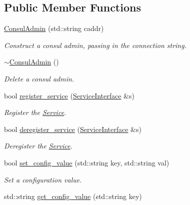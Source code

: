 \subsection*{Public Member Functions}
\begin{DoxyCompactItemize}
\item 
\hypertarget{classConsulAdmin_aafb2c493da3672acc348fd865036a883}{\hyperlink{classConsulAdmin_aafb2c493da3672acc348fd865036a883}{Consul\-Admin} (std\-::string caddr)}\label{classConsulAdmin_aafb2c493da3672acc348fd865036a883}

\begin{DoxyCompactList}\small\item\em Construct a consul admin, passing in the connection string. \end{DoxyCompactList}\item 
\hypertarget{classConsulAdmin_ac84ff8c80f6bd731329c8acb6d236759}{\hyperlink{classConsulAdmin_ac84ff8c80f6bd731329c8acb6d236759}{$\sim$\-Consul\-Admin} ()}\label{classConsulAdmin_ac84ff8c80f6bd731329c8acb6d236759}

\begin{DoxyCompactList}\small\item\em Delete a consul admin. \end{DoxyCompactList}\item 
\hypertarget{classConsulAdmin_ac57f2f235c1b9a2f48a8d2e9f0b7867d}{bool \hyperlink{classConsulAdmin_ac57f2f235c1b9a2f48a8d2e9f0b7867d}{register\-\_\-service} (\hyperlink{classServiceInterface}{Service\-Interface} \&s)}\label{classConsulAdmin_ac57f2f235c1b9a2f48a8d2e9f0b7867d}

\begin{DoxyCompactList}\small\item\em Register the \hyperlink{classService}{Service}. \end{DoxyCompactList}\item 
\hypertarget{classConsulAdmin_abd76347ba5a0798b3960672c8861d3e9}{bool \hyperlink{classConsulAdmin_abd76347ba5a0798b3960672c8861d3e9}{deregister\-\_\-service} (\hyperlink{classServiceInterface}{Service\-Interface} \&s)}\label{classConsulAdmin_abd76347ba5a0798b3960672c8861d3e9}

\begin{DoxyCompactList}\small\item\em Deregister the \hyperlink{classService}{Service}. \end{DoxyCompactList}\item 
bool \hyperlink{classConsulAdmin_a152fc37965039733bb53c56e208b4492}{set\-\_\-config\-\_\-value} (std\-::string key, std\-::string val)
\begin{DoxyCompactList}\small\item\em Set a configuration value. \end{DoxyCompactList}\item 
\hypertarget{classConsulAdmin_a42569b08fba671535856c345fa05ef33}{std\-::string \hyperlink{classConsulAdmin_a42569b08fba671535856c345fa05ef33}{get\-\_\-config\-\_\-value} (std\-::string key)}\label{classConsulAdmin_a42569b08fba671535856c345fa05ef33}


\end{DoxyCompactItemize}
